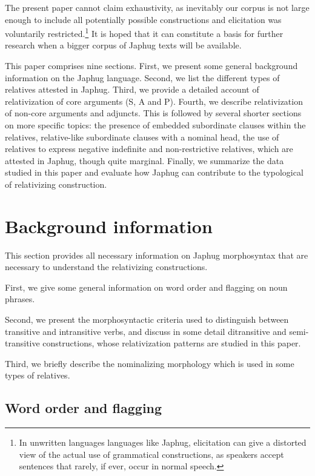 \documentclass[oldfontcommands,oneside,a4paper,11pt]{article}
\begin{document}
The present paper  cannot claim exhaustivity, as inevitably our corpus is not large enough to include all potentially possible constructions and elicitation was voluntarily restricted.\footnote{In unwritten languages languages like Japhug, elicitation can give a distorted view of the actual use of grammatical constructions, as speakers accept sentences that rarely, if ever, occur in normal speech.  }  It is hoped that it can constitute a basis for further research when a bigger corpus of Japhug texts will be available.

This paper comprises nine sections. First, we present some general background information on the Japhug language. Second, we list the different types of relatives attested in Japhug. Third, we provide a detailed account of relativization of core arguments (S, A and P). Fourth, we describe relativization of non-core arguments and adjuncts. This is followed by several shorter sections on more specific topics: the presence of embedded subordinate clauses within the relatives, relative-like subordinate clauses with a nominal head, the use of relatives to express negative indefinite and non-restrictive relatives, which are attested in Japhug, though quite marginal. Finally, we summarize the data studied in this paper and evaluate how Japhug can contribute to the typological of relativizing construction.
 
 

 


\section{Background information}
This section provides all necessary information on Japhug morphosyntax that are necessary to understand the relativizing constructions. 

First, we give some general information on word order and flagging on noun phrases.

Second, we present the morphosyntactic criteria used to distinguish between transitive and intransitive verbs, and discuss in some detail ditransitive and semi-transitive constructions, whose relativization patterns are studied in this paper.

Third, we briefly describe the nominalizing morphology which is used in some types of relatives.

\subsection{Word order and flagging}
\end{document}
